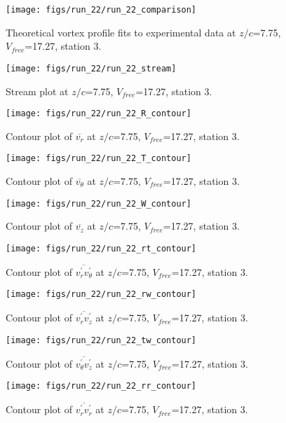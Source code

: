 \begin{figure}[H]
\centering
\texttt{[image: figs/run\_22/run\_22\_comparison]}
\caption{Theoretical vortex profile fits to experimental data at $z/c$=7.75, $V_{free}$=17.27, station 3.}
\end{figure}


\begin{figure}[H]
\centering
\texttt{[image: figs/run\_22/run\_22\_stream]}
\caption{Stream plot at $z/c$=7.75, $V_{free}$=17.27, station 3.}
\end{figure}


\begin{figure}[H]
\centering
\texttt{[image: figs/run\_22/run\_22\_R\_contour]}
\caption{Contour plot of $\overline{v_{r}}$ at $z/c$=7.75, $V_{free}$=17.27, station 3.}
\end{figure}


\begin{figure}[H]
\centering
\texttt{[image: figs/run\_22/run\_22\_T\_contour]}
\caption{Contour plot of $\overline{v_{\theta}}$ at $z/c$=7.75, $V_{free}$=17.27, station 3.}
\end{figure}


\begin{figure}[H]
\centering
\texttt{[image: figs/run\_22/run\_22\_W\_contour]}
\caption{Contour plot of $\overline{v_{z}}$ at $z/c$=7.75, $V_{free}$=17.27, station 3.}
\end{figure}


\begin{figure}[H]
\centering
\texttt{[image: figs/run\_22/run\_22\_rt\_contour]}
\caption{Contour plot of $\overline{v_{r}^{\prime} v_{\theta}^{\prime}}$ at $z/c$=7.75, $V_{free}$=17.27, station 3.}
\end{figure}


\begin{figure}[H]
\centering
\texttt{[image: figs/run\_22/run\_22\_rw\_contour]}
\caption{Contour plot of $\overline{v_{r}^{\prime} v_{z}^{\prime}}$ at $z/c$=7.75, $V_{free}$=17.27, station 3.}
\end{figure}


\begin{figure}[H]
\centering
\texttt{[image: figs/run\_22/run\_22\_tw\_contour]}
\caption{Contour plot of $\overline{v_{\theta}^{\prime} v_{z}^{\prime}}$ at $z/c$=7.75, $V_{free}$=17.27, station 3.}
\end{figure}


\begin{figure}[H]
\centering
\texttt{[image: figs/run\_22/run\_22\_rr\_contour]}
\caption{Contour plot of $\overline{v_{r}^{\prime} v_{r}^{\prime}}$ at $z/c$=7.75, $V_{free}$=17.27, station 3.}
\end{figure}


